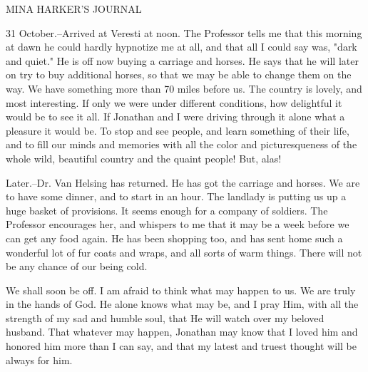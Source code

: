 MINA HARKER'S JOURNAL 

31 October.--Arrived at Veresti at noon. The Professor tells me that this morning at dawn he could hardly hypnotize me at all, and that all I could say was, "dark and quiet." He is off now buying a carriage and horses. He says that he will later on try to buy additional horses, so that we may be able to change them on the way. We have something more than 70 miles before us. The country is lovely, and most interesting. If only we were under different conditions, how delightful it would be to see it all. If Jonathan and I were driving through it alone what a pleasure it would be. To stop and see people, and learn something of their life, and to fill our minds and memories with all the color and picturesqueness of the whole wild, beautiful country and the quaint people! But, alas! 

Later.--Dr. Van Helsing has returned. He has got the carriage and horses. We are to have some dinner, and to start in an hour. The landlady is putting us up a huge basket of provisions. It seems enough for a company of soldiers. The Professor encourages her, and whispers to me that it may be a week before we can get any food again. He has been shopping too, and has sent home such a wonderful lot of fur coats and wraps, and all sorts of warm things. There will not be any chance of our being cold. 

We shall soon be off. I am afraid to think what may happen to us. We are truly in the hands of God. He alone knows what may be, and I pray Him, with all the strength of my sad and humble soul, that He will watch over my beloved husband. That whatever may happen, Jonathan may know that I loved him and honored him more than I can say, and that my latest and truest thought will be always for him. 
